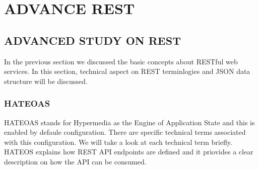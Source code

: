 
\chapter{ADVANCE REST}

\section{ADVANCED STUDY ON REST}\label{s:rest-advanced}

In the previous section we discussed the basic concepts about RESTful
web services. In this section, technical aspect on REST terminlogies
and JSON data structure will be discussed.


\subsection{HATEOAS}

HATEOAS stands for Hypermedia as the Engine of Application State and
this is enabled by defaule configuration. There are specific technical
terms associated with this configuration. We will take a look at each
technical term briefly. HATEOS explains how REST API endpoints are
defined and it priovides a clear description on how the API can be
consumed.

